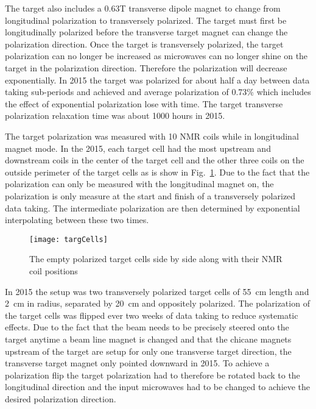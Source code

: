 The target also includes a 0.63T transverse dipole magnet to change from
longitudinal polarization to transversely polarized.  The target must first be
longitudinally polarized before the transverse target magnet can change the
polarization direction.  Once the target is transversely polarized, the target
polarization can no longer be increased as microwaves can no longer shine on the
target in the polarization direction.  Therefore the polarization will decrease
exponentially.  In 2015 the target was polarized for about half a day between
data taking sub-periods and achieved and average polarization of 0.73\% which
includes the effect of exponential polarization lose with time.  The target
transverse polarization relaxation time was about 1000 hours in 2015. \par

The target polarization was measured with 10 NMR coils while in longitudinal
magnet mode.  In the 2015, each target cell had the most upstream and downstream
coils in the center of the target cell and the other three coils on the outside
perimeter of the target cells as is show in Fig.~\ref{fig::targCells}.  Due to
the fact that the polarization can only be measured with the longitudinal magnet
on, the polarization is only measure at the start and finish of a transversely
polarized data taking.  The intermediate polarization are then determined by
exponential interpolating between these two times.

\begin{figure}[h!t]
  \centering
  \texttt{[image: targCells]}
  \caption{The empty polarized target cells side by side along with their NMR
    coil positions}
  \label{fig::targCells}
\end{figure}

In 2015 the setup was two transversely polarized target cells of 55~cm length
and 2~cm in radius, separated by 20~cm and oppositely polarized.  The
polarization of the target cells was flipped ever two weeks of data taking to
reduce systematic effects.  Due to the fact that the beam needs to be precisely
steered onto the target anytime a beam line magnet is changed and that the
chicane magnets upstream of the target are setup for only one transverse target
direction, the transverse target magnet only pointed downward in 2015.  To
achieve a polarization flip the target polarization had to therefore be rotated
back to the longitudinal direction and the input microwaves had to be changed to
achieve the desired polarization direction. \par


